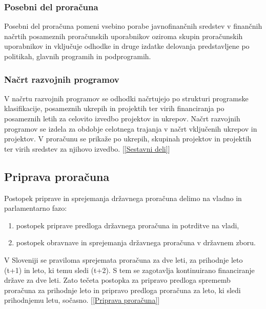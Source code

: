 \documentclass[12pt, a4paper]{article}
\begin{document}
\subsubsection[Posebni del proračuna]{Posebni del proračuna}
Posebni del proračuna pomeni vsebino porabe javnofinančnih sredstev v finančnih načrtih posameznih proračunskih uporabnikov oziroma skupin proračunskih uporabnikov in vključuje odhodke in druge izdatke delovanja predstavljene po politikah, glavnih programih in podprogramih. 

\subsubsection[Načrt razvojnih programov]{Načrt razvojnih programov}
V načrtu razvojnih programov se odhodki načrtujejo po strukturi programske klasifikacije, posameznih ukrepih in projektih ter virih financiranja po posameznih letih za celovito izvedbo projektov in ukrepov. Načrt razvojnih programov se izdela za obdobje celotnega trajanja v načrt vključenih ukrepov in projektov. V proračunu se prikaže po ukrepih, skupinah projektov in projektih ter virih sredstev za njihovo izvedbo. [\ref{Sestavni deli}]

\subsection[Priprava proračuna]{Priprava proračuna}
Postopek priprave in sprejemanja državnega proračuna delimo na vladno in parlamentarno fazo:
\begin{enumerate}
\item postopek priprave predloga državnega proračuna in potrditve na vladi,
\item postopek obravnave in sprejemanja državnega proračuna v državnem zboru.
\end{enumerate}
V Sloveniji se praviloma sprejemata proračuna za dve leti, za prihodnje leto (t+1) in leto, ki temu sledi (t+2). S tem se zagotavlja kontinuirano financiranje države za dve leti. Zato tečeta postopka za pripravo predloga sprememb proračuna za prihodnje leto in pripravo predloga proračuna za leto, ki sledi prihodnjemu letu, sočasno. [\ref{Priprava proračuna}]

\newpage
\end{document}

